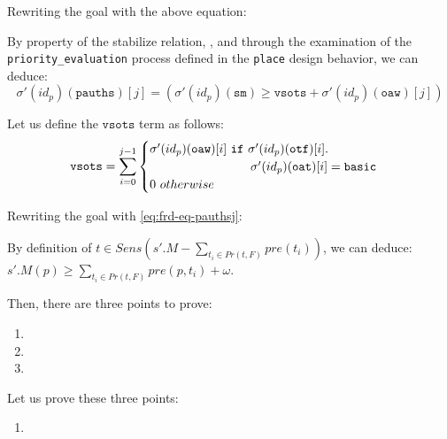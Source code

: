 \documentclass[dvipsnames,12pt]{article}
\begin{document}
\begin{niproof}
\begin{enumerate}
\begin{itemize}
\begin{itemize}
        Rewriting the goal with the above equation:

        By property of the stabilize relation, \InCsCompP, and
        through the examination of the \texttt{priority_evaluation}
        process defined in the \texttt{place} design behavior, we
        can deduce:
        \begin{equation}
          \label{eq:frd-eq-pauthsj}
          \sigma'(id_p)(\texttt{pauths})[j]=(\sigma'(id_p)(\texttt{sm})\ge{}\mathtt{vsots}+\sigma'(id_p)(\texttt{oaw})[j])
        \end{equation}

        Let us define the $\mathtt{vsots}$ term as follows:
        \begin{equation}
          \label{eq:frd-vsots}
          \mathtt{vsots}=\sum\limits_{i=0}^{j-1}
          \begin{cases}
            \sigma'(id_p)(\texttt{oaw})[i]~\mathtt{if}~\sigma'(id_p)(\texttt{otf})[i].\\
            \hspace{19ex}\sigma'(id_p)(\texttt{oat})[i]=\mathtt{basic}\\
            0~otherwise\\
          \end{cases}
        \end{equation}

        Rewriting the goal with \eqref{eq:frd-eq-pauthsj}:

        By definition of
        $t\in{}Sens(s'.M-\sum\limits_{t_i\in{}Pr(t,F)}pre(t_i))$, we
        can deduce:\\
        $s'.M(p)\ge{}\sum\limits_{t_i\in{}Pr(t,F)}pre(p,t_i)+\omega$.
        
        Then, there are three points to prove:
        \begin{enumerate}
        \item {}
        \item {}
        \item {}
        \end{enumerate}

        Let us prove these three points:
        \begin{enumerate}
        \item {}


\end{enumerate}
\end{itemize}
\end{itemize}
\end{enumerate}
\end{niproof}
\end{document}
